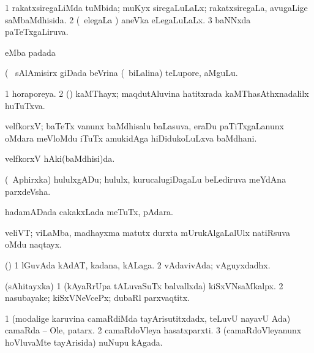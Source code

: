 \bentry
{} 
\gl{\gu}
\bmng
\bnum
\num{1} rakatxsiregaLiMda tuMbida; muKyx siregaLuLaLx; rakatxsiregaLa, avugaLige saMbaMdhisida. 
\num{2} (\kanmu\ elegaLa \vi) aneVka eLegaLuLaLx. 
\num{3} baNNxda paTeTxgaLiruva. 
\enum
\emng
\eentry

\bentry
{} 
\gl{\nA}
\expl{}
\bmng
  eMba padada \bava 
\emng
\eentry

\bentry
{} 
\gl{\nA}(\bava\ 
\bmng
 sAlAmisirx giDada beVrina (\kanmu\ biLalina) teLupore, aMguLu. 
\emng
\eentry

\bentry
{} 
\gl{\gu}
\expl{}
\bmng
\bnum
\num{1} horaporeya. 
\num{2} (\dhavxni) kaMThayx; maqdutAluvina hatitxrada kaMThasAthxnadalilx huTuTxva. 
\enum
\emng
\eentry

\bentry
{} 
\gl{\nA}
\expl{(\P)}
\bmng
 velfkorxV; baTeTx \mo vanunx baMdhisalu baLasuva, eraDu paTiTxgaLanunx oMdara meVloMdu iTuTx amukidAga hiDidukoLuLxva baMdhani. 
\emng
\eentry

\bentry
{} 
\gl{\gu}
\expl{}
\bmng
 velfkorxV hAki(baMdhisi)da. 
\emng
\eentry

\bentry
{} 
\gl{\nA}
\expl{}
\bmng
 (\da\ Aphirxka) hululxgADu; hululx, kurucalugiDagaLu beLediruva meYdAna parxdeVsha. 
\emng
\eentry

\bentry
{} 
\gl{\nA}
\expl{}
\bmng
hadamADada cakakxLada meTuTx, pAdara. 
\emng
\eentry

\bentry
{} 
\gl{\nA}
\expl{}
\bmng
\emng
\eentry

\bentry
{} 
\gl{\nA}
\expl{}
\bmng
 veliVT; viLaMba, madhayxma matutx durxta mUrukAlgaLalUlx natiRsuva oMdu naqtayx. 
\emng
\eentry

\bentry
{} 
\gl{\nA}
\expl{}
\bmng
 (\pArxparx) 
\bnum
\num{1} lGuvAda kAdAT, kadana, kALaga. 
\num{2} vAdavivAda; vAguyxdadhx. 
\enum
\emng
\eentry

\bentry
{} 
\gl{\nA}
\expl{}
\bmng
 (sAhitayxka) 
\bnum
\num{1} (kAyaRrUpa tALuvaSuTx balvallxda) kiSxVNsaMkalpx. 
\num{2} nasubayake; kiSxVNeVcePx; dubaRl parxvaqtitx. 
\enum
\emng
\eentry

\bentry
{} 
\gl{\nA}
\expl{}
\bmng
\bnum
\num{1} (modalige karuvina camaRdiMda tayArisutitxdadx, teLuvU nayavU Ada) camaRda -- Ole, patarx. 
\num{2} camaRdoVleya hasatxparxti. 
\num{3} (camaRdoVleyanunx hoVluvaMte tayArisida) nuNupu kAgada. 
\enum
\emng
\eentry

